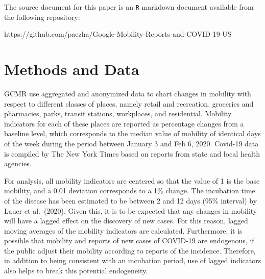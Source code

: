 \documentclass[]{elsarticle} %
\begin{document}
The source document for this paper is an \texttt{R} markdown document
available from the following repository:

https://github.com/paezha/Google-Mobility-Reports-and-COVID-19-US

\hypertarget{methods-and-data}{%
\section{Methods and Data}\label{methods-and-data}}

GCMR use aggregated and anonymized data to chart changes in mobility
with respect to different classes of places, namely retail and
recreation, groceries and pharmacies, parks, transit stations,
workplaces, and residential. Mobility indicators for each of these
places are reported as percentage changes from a baseline level, which
corresponds to the median value of mobility of identical days of the
week during the period between January 3 and Feb 6, 2020. Covid-19 data
is compiled by The New York Times based on reports from state and local
health agencies.

For analysis, all mobility indicators are centered so that the value of
1 is the base mobility, and a 0.01 deviation corresponds to a 1\%
change. The incubation time of the disease has been estimated to be
between 2 and 12 days (95\% interval) by Lauer et al.~(2020). Given
this, it is to be expected that any changes in mobility will have a
lagged effect on the discovery of new cases. For this reason, lagged
moving averages of the mobility indicators are calculated. Furthermore,
it is possible that mobility and reports of new cases of COVID-19 are
endogenous, if the public adjust their mobility according to reports of
the incidence. Therefore, in addition to being consistent with an
incubation period, use of lagged indicators also helps to break this
potential endogeneity.
\end{document}
